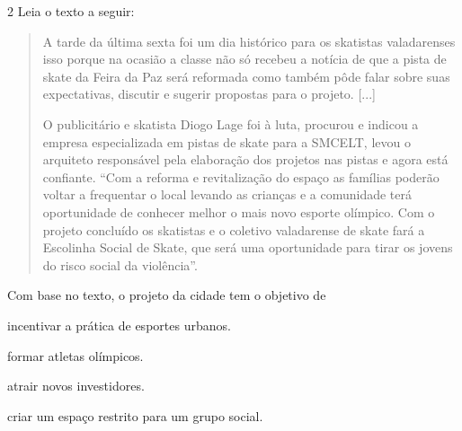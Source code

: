 
\num{2} Leia o texto a seguir:

\begin{quote}
A tarde da última sexta foi um dia histórico para os skatistas
valadarenses isso porque na ocasião a classe não só recebeu a notícia de
que a pista de skate da Feira da Paz será reformada como também pôde
falar sobre suas expectativas, discutir e sugerir propostas para o
projeto. {[}...{]}

O publicitário e skatista Diogo Lage foi à luta, procurou e indicou a
empresa especializada em pistas de skate para a SMCELT, levou o
arquiteto responsável pela elaboração dos projetos nas pistas e agora
está confiante. ``Com a reforma e revitalização do espaço as famílias
poderão voltar a frequentar o local levando as crianças e a comunidade
terá oportunidade de conhecer melhor o mais novo esporte olímpico. Com o
projeto concluído os skatistas e o coletivo valadarense de skate fará a
Escolinha Social de Skate, que será uma oportunidade para tirar os
jovens do risco social da violência''.

\end{quote}

Com base no texto, o projeto da cidade tem o objetivo de

\begin{escolha}
\item incentivar a prática de esportes urbanos.

\item formar atletas olímpicos.

\item atrair novos investidores.

\item criar um espaço restrito para um grupo social.
\end{escolha}


